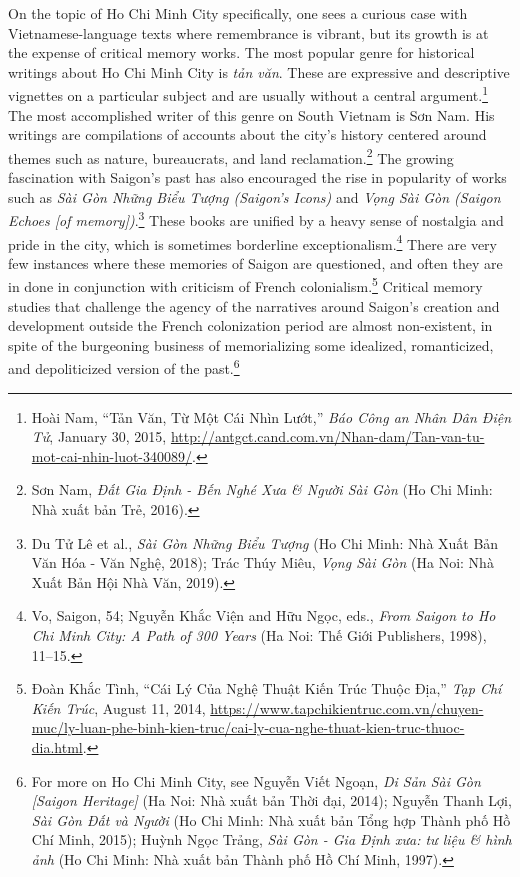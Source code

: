 On the topic of Ho Chi Minh City specifically, one sees a curious case with Vietnamese-language texts where remembrance is vibrant, but its growth is at the expense of critical memory works. The most popular genre for historical writings about Ho Chi Minh City is \textit{tản văn}. These are expressive and descriptive vignettes on a particular subject and are usually without a central argument.\footnote{Hoài Nam, “Tản Văn, Từ Một Cái Nhìn Lướt,” \textit{Báo Công an Nhân Dân Điện Tử}, January 30, 2015, \url{http://antgct.cand.com.vn/Nhan-dam/Tan-van-tu-mot-cai-nhin-luot-340089/}.} The most accomplished writer of this genre on South Vietnam is Sơn Nam. His writings are compilations of accounts about the city’s history centered around themes such as nature, bureaucrats, and land reclamation.\footnote{Sơn Nam, \textit{Đất Gia Định - Bến Nghé Xưa \& Người Sài Gòn} (Ho Chi Minh: Nhà xuất bản Trẻ, 2016).} The growing fascination with Saigon’s past has also encouraged the rise in popularity of works such as \textit{Sài Gòn Những Biểu Tượng (Saigon’s Icons)} and \textit{Vọng Sài Gòn (Saigon Echoes [of memory])}.\footnote{Du Tử Lê et al., \textit{Sài Gòn Những Biểu Tượng} (Ho Chi Minh: Nhà Xuất Bản Văn Hóa - Văn Nghệ, 2018); Trác Thúy Miêu, \textit{Vọng Sài Gòn} (Ha Noi: Nhà Xuất Bản Hội Nhà Văn, 2019).} These books are unified by a heavy sense of nostalgia and pride in the city, which is sometimes borderline exceptionalism.\footnote{Vo, Saigon, 54; Nguyễn Khắc Viện and Hữu Ngọc, eds., \textit{From Saigon to Ho Chi Minh City: A Path of 300 Years} (Ha Noi: Thế Giới Publishers, 1998), 11–15.} There are very few instances where these memories of Saigon are questioned, and often they are in done in conjunction with criticism of French colonialism.\footnote{Đoàn Khắc Tình, “Cái Lý Của Nghệ Thuật Kiến Trúc Thuộc Địa,” \textit{Tạp Chí Kiến Trúc}, August 11, 2014, \url{https://www.tapchikientruc.com.vn/chuyen-muc/ly-luan-phe-binh-kien-truc/cai-ly-cua-nghe-thuat-kien-truc-thuoc-dia.html}.} Critical memory studies that challenge the agency of the narratives around Saigon’s creation and development outside the French colonization period are almost non-existent, in spite of the burgeoning business of memorializing some idealized, romanticized, and depoliticized version of the past.\footnote{For more on Ho Chi Minh City, see Nguyễn Viết Ngoạn, \textit{Di Sản Sài Gòn [Saigon Heritage]} (Ha Noi: Nhà xuất bản Thời đại, 2014); Nguyễn Thanh Lợi, \textit{Sài Gòn Đất và Người} (Ho Chi Minh: Nhà xuất bản Tổng hợp Thành phố Hồ Chí Minh, 2015); Huỳnh Ngọc Trảng, \textit{Sài Gòn - Gia Định xưa: tư liệu \& hình ảnh} (Ho Chi Minh: Nhà xuất bản Thành phố Hồ Chí Minh, 1997).}

